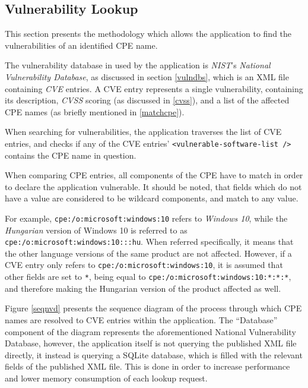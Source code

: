 \documentclass[a4paper,12pt]{article}
\begin{document}
\subsection{Vulnerability Lookup}
 
	
	This section presents the methodology which allows the application to find the vulnerabilities of an identified CPE name.
	
	The vulnerability database in used by the application is \textit{NIST}'s \textit{National Vulnerability Database}, as discussed in section \ref{vulndbs}, which is an XML file containing \textit{CVE} entries. A CVE entry represents a single vulnerability, containing its description, \textit{CVSS} scoring (as discussed in \ref{cvss}), and a list of the affected CPE names (as briefly mentioned in \ref{matchcpe}).
	
	When searching for vulnerabilities, the application traverses the list of CVE entries, and checks if any of the CVE entries' \texttt{<vulnerable-software-list />} contains the CPE name in question.
	
	When comparing CPE entries, all components of the CPE have to match in order to declare the application vulnerable. It should be noted, that fields which do not have a value are considered to be wildcard components, and match to any value.
	
	For example, \texttt{cpe:/o:microsoft:windows:10} refers to \textit{Windows 10}, while the \textit{Hungarian} version of Windows 10 is referred to as \texttt{cpe:/o:microsoft:windows:10:::hu}. When referred specifically, it means that the other language versions of the same product are not affected. However, if a CVE entry only refers to \texttt{cpe:/o:microsoft:windows:10}, it is assumed that other fields are set to \texttt{*}, being equal to \texttt{cpe:/o:microsoft:windows:10:*:*:*}, and therefore making the Hungarian version of the product affected as well.
	
	Figure \ref{seqnvd} presents the sequence diagram of the process through which CPE names are resolved to CVE entries within the application. The ``Database'' component of the diagram represents the aforementioned National Vulnerability Database, however, the application itself is not querying the published XML file directly, it instead is querying a SQLite database, which is filled with the relevant fields of the published XML file. This is done in order to increase performance and lower memory consumption of each lookup request.
	
\end{document}
